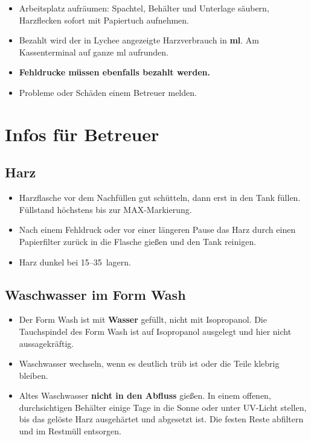 \documentclass{\basedir/fablab-document}
\begin{document}
\begin{itemize}
	\item Arbeitsplatz aufräumen: Spachtel, Behälter und Unterlage säubern, Harzflecken sofort mit Papiertuch aufnehmen.
	\item Bezahlt wird der in Lychee angezeigte Harzverbrauch in \textbf{ml}. Am Kassenterminal auf ganze ml aufrunden.
	\item \textbf{Fehldrucke müssen ebenfalls bezahlt werden.}
	\item Probleme oder Schäden einem Betreuer melden.
\end{itemize}

\section{Infos für Betreuer}

\subsection{Harz}

\begin{itemize}
	\item Harzflasche vor dem Nachfüllen gut schütteln, dann erst in den Tank füllen. Füllstand höchstens bis zur MAX-Markierung.
	\item Nach einem Fehldruck oder vor einer längeren Pause das Harz durch einen Papierfilter zurück in die Flasche gießen und den Tank reinigen.
	\item Harz dunkel bei 15--35\,\textcelsius{} lagern.
\end{itemize}

\subsection{Waschwasser im Form Wash}

\begin{itemize}
	\item Der Form Wash ist mit \textbf{Wasser} gefüllt, nicht mit Isopropanol. Die Tauchspindel des Form Wash ist auf Isopropanol ausgelegt und hier nicht aussagekräftig.
	\item Waschwasser wechseln, wenn es deutlich trüb ist oder die Teile klebrig bleiben.
	\item Altes Waschwasser \textbf{nicht in den Abfluss} gießen. In einem offenen, durchsichtigen Behälter einige Tage in die Sonne oder unter UV-Licht stellen, bis das gelöste Harz ausgehärtet und abgesetzt ist. Die festen Reste abfiltern und im Restmüll entsorgen.
\end{itemize}
\end{document}
